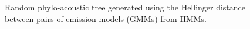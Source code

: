 \documentclass[pdftex,11pt,a4paper]{article}
\theoremstyle{definition}
\theoremstyle{remark}
\begin{document}
\begin{figure}
\noindent{}
    \caption{Random phylo-acoustic tree generated using the Hellinger distance between pairs of emission models (GMMs) from HMMs.}
    \label{fig:rgmmhellinger}
\end{figure}
\end{document}
